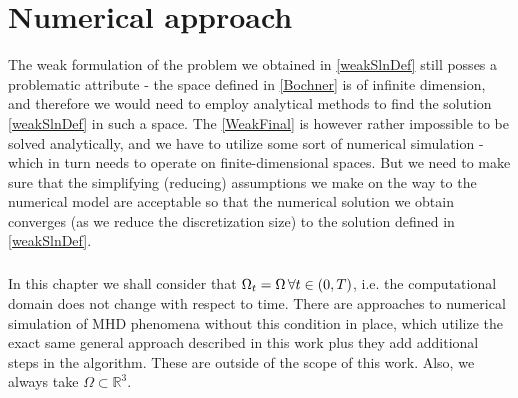 \chapter{Numerical approach}
The weak formulation of the problem we obtained in \cref{weakSlnDef} still posses a problematic attribute - the space defined in \cref{Bochner} is of infinite dimension, and therefore we would need to employ analytical methods to find the solution \cref{weakSlnDef} in such a space. The \cref{WeakFinal} is however rather impossible to be solved analytically, and we have to utilize some sort of numerical simulation - which in turn needs to operate on finite-dimensional spaces. But we need to make sure that the simplifying (reducing) assumptions we make on the way to the numerical model are acceptable so that the numerical solution we obtain converges (as we reduce the discretization size) to the solution defined in \cref{weakSlnDef}.

\paragraph{}
In this chapter we shall consider that $\Omega_t = \Omega\, \forall t \in \left( 0, T\right) $, i.e. the computational domain does not change with respect to time. There are approaches to numerical simulation of MHD phenomena without this condition in place, which utilize the exact same general approach described in this work plus they add additional steps in the algorithm. These are outside of the scope of this work. Also, we always take $\Omega \subset \mathbb{R}^3$.



















